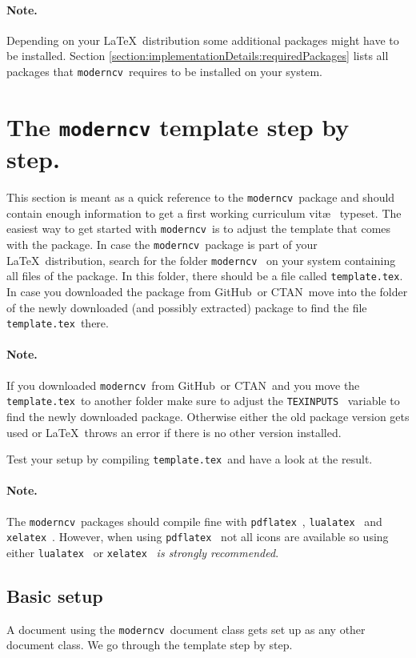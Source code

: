 \documentclass[a4paper,11pt]{article}
\newcommand{\code}[1]{\lstinline!#1!}
\newcommand{\Code}[1]{\lstinline!#1!~} %
\newcommand{\Moderncv}{\Code{moderncv}}
\newcommand{\Github}{GitHub~}
\newcommand{\Ctan}{CTAN~}
\newcommand{\cvtemplate}{\code{template.tex}}
\newcommand{\Cvtemplate}{\code{template.tex}~}
\begin{document}
\paragraph{Note.} Depending on your \LaTeX\ distribution some additional packages might have to be installed. 
Section \ref{section:implementationDetails:requiredPackages} lists all packages that \Moderncv requires to be installed on your system. 

\section{The \texttt{moderncv} template step by step.}
This section is meant as a quick reference to the \Moderncv package and should contain enough information 
to get a first working curriculum vit\ae~ typeset. 
\label{section:moderncvTemplate}
The easiest way to get started with \Moderncv is to adjust the template that comes with the package.
In case the \Moderncv package is part of your \LaTeX\ distribution, search for the folder \Moderncv 
on your system containing all files of the package. 
In this folder, there should be a file called \cvtemplate. 
In case you downloaded the package from \Github or \Ctan move into the folder of the newly downloaded (and possibly extracted) package to 
find the file \Cvtemplate there. 

\paragraph{Note.} If you downloaded \Moderncv from \Github or \Ctan and you move the \Cvtemplate to another folder make sure to adjust the \Code{TEXINPUTS} variable to find the newly downloaded package. 
Otherwise either the old package version gets used or \LaTeX\ throws an error if there is no other version installed.

Test your setup by compiling \Cvtemplate and have a look at the result. 

\paragraph{Note.} The \Moderncv packages should compile fine with \Code{pdflatex}, \Code{lualatex} and \Code{xelatex}. However, when using \Code{pdflatex} not all icons are available so using either 
\Code{lualatex} or \Code{xelatex} \emph{is strongly recommended}.

\subsection{Basic setup}
A document using the \Moderncv document class gets set up as any other document class. We go through the template step by step.
\end{document}
